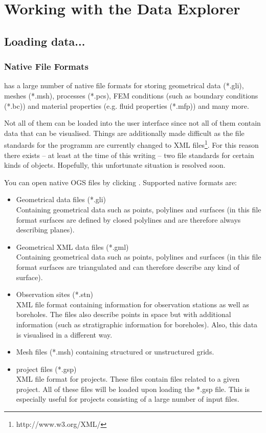 \chapter{Working with the Data Explorer}

\section{Loading data...}

\subsection{Native File Formats}
\label{nativefileformats}

\ogs has a large number of native file formats for storing geometrical data (*.gli), meshes (*.msh), processes (*.pcs), FEM conditions (such as boundary conditions (*.bc)) and material properties (e.g. fluid properties (*.mfp)) and many more.

Not all of them can be loaded into the user interface since not all of them contain data that can be visualised. Things are additionally made difficult as the file standards for the programm are currently changed to XML files\footnote{http://www.w3.org/XML/}. For this reason there exists -- at least at the time of this writing -- two file standards for certain kinds of objects. Hopefully, this unfortunate situation is resolved soon.

You can open native OGS files by clicking . Supported native \ogs formats are:
\begin{itemize}
\item Geometrical data files (*.gli)\\
    Containing geometrical data such as points, polylines and surfaces (in this file format surfaces are defined by closed polylines and are therefore always describing planes).
\item Geometrical XML data files (*.gml)\\
    Containing geometrical data such as points, polylines and surfaces (in this file format surfaces are triangulated and can therefore describe any kind of surface).
\item Observation sites (*.stn)\\
    XML file format containing information for observation stations as well as boreholes. The files also describe points in space but with additional information (such as stratigraphic information for boreholes). Also, this data is visualised in a different way.
\item Mesh files (*.msh) containing structured or unstructured grids.
\item \ogs project files (*.gsp)\\
    XML file format for \ogs projects. These files contain files related to a given project. All of these files will be loaded upon loading the *.gsp file. This is especially useful for projects consisting of a large number of input files.
\end{itemize}
    
